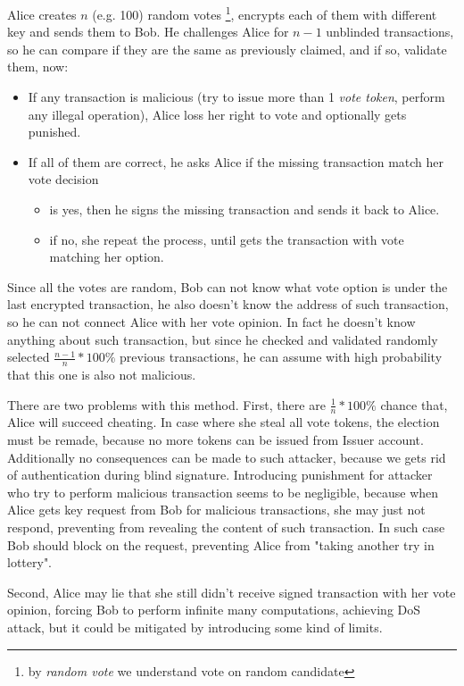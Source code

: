 \documentclass[runningheads]{llncs}
\begin{document}
Alice creates \(n\) (e.g. 100) random votes \footnote{by \textit{random vote} we understand vote on random candidate}, encrypts each of them with different key and sends them to Bob. He challenges Alice for \(n-1\) unblinded transactions, so he can compare if they are the same as previously claimed, and if so, validate them, now: 
\begin{itemize}
 \item If any transaction is malicious (try to issue more than 1 \textit{vote token}, perform any illegal operation), Alice loss her right to vote and optionally gets punished.

 \item If all of them are correct, he asks Alice if the missing transaction match her vote decision
 \begin{itemize}
    \item is yes, then he signs the missing transaction and sends it back to Alice.
    \item if no, she repeat the process, until gets the transaction with vote matching her option.
 \end{itemize}
\end{itemize}
Since all the votes are random, Bob can not know what vote option is under the last encrypted transaction, he also doesn't know the address of such transaction, so he can not connect Alice with her vote opinion. In fact he doesn't know anything about such transaction, but since he checked and validated randomly selected \(\frac{n-1}{n}*100\%\) previous transactions, he can assume with high probability that this one is also not malicious.

There are two problems with this method.
First, there are \(\frac{1}{n}*100\%\) chance that, Alice will succeed cheating. In case where she steal all vote tokens, the election must be remade, because no more tokens can be issued from Issuer account. Additionally no consequences can be made to such attacker, because we gets rid of authentication during blind signature. Introducing punishment for attacker who try to perform malicious transaction seems to be negligible, because when Alice gets key request from Bob for malicious transactions, she may just not respond, preventing from revealing the content of such transaction. In such case Bob should block on the request, preventing Alice from "taking another try in lottery".

Second, Alice may lie that she still didn't receive signed transaction with her vote opinion, forcing Bob to perform infinite many computations, achieving DoS attack, but it could be mitigated by introducing some kind of limits.
\end{document}
